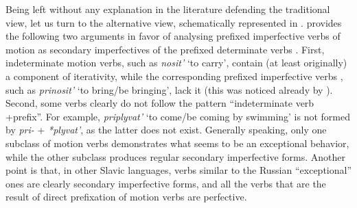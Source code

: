 Being left without any explanation in the literature defending the traditional view, let us turn to the alternative view, schematically represented in . \citet{Regnell:44} provides the following two arguments in favor of analysing prefixed imperfective verbs  of motion as secondary imperfectives  of the prefixed determinate verbs . First, indeterminate motion verbs, such as \textit{nosit'}\textsubscript{\INDET} `to carry', contain (at least originally) a component of iterativity, while the corresponding prefixed imperfective verbs , such as \textit{prinosit'} `to bring/be bringing', lack it (this was noticed already by \citealt{Mazon:1928}). Second, some verbs clearly do not follow the pattern ``indeterminate verb +prefix''. For example, \textit{priplyvat'} `to come/be coming by swimming' is not formed by \textit{pri-}   + \textit{*plyvat'}, as the latter does not exist. Generally speaking, only one subclass of motion verbs demonstrates what seems to be an exceptional behavior, while the other subclass produces regular secondary imperfective  forms. Another point is that, in other Slavic languages, verbs similar to the Russian ``exceptional'' ones are clearly secondary imperfective  forms, and all the verbs that are the result of direct prefixation  of motion verbs are perfective.

